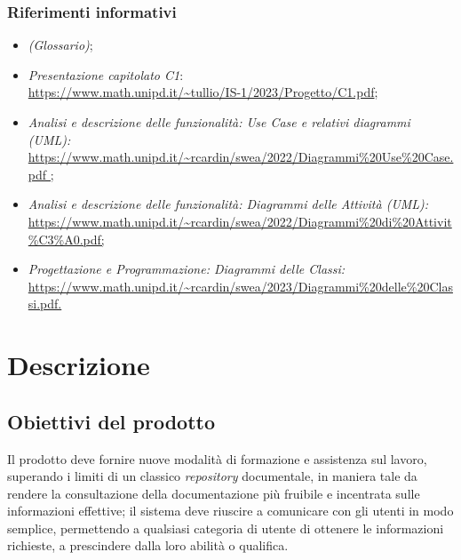 \documentclass[10pt, a4paper]{article}
\begin{document}
    \subsubsection{Riferimenti informativi}
    \begin{itemize}
    \item \textit{(Glossario)};
    \item \textit{Presentazione capitolato C1}:\\
    \href{https://www.math.unipd.it/~tullio/IS-1/2023/Progetto/C1.pdf}{https://www.math.unipd.it/\textasciitilde tullio/IS-1/2023/Progetto/C1.pdf};
    
    \item \textit{Analisi e descrizione delle funzionalità: Use Case e relativi diagrammi (UML):}\\
    \href{https://www.math.unipd.it/~rcardin/swea/2022/Diagrammi%20Use%20Case.pdf}{https://www.math.unipd.it/\textasciitilde rcardin/swea/2022/Diagrammi\%20Use\%20Case.pdf ;}
    \item \textit{Analisi e descrizione delle funzionalità: Diagrammi delle Attività (UML):}\\
    \href{https://www.math.unipd.it/~rcardin/swea/2022/Diagrammi%20di%20Attivit%C3%A0.pdf}{https://www.math.unipd.it/\textasciitilde rcardin/swea/2022/Diagrammi\%20di\%20Attivit\%C3\%A0.pdf;}
    \item \textit{Progettazione e Programmazione: Diagrammi delle Classi:}\\
    \href{https://www.math.unipd.it/~rcardin/swea/2023/Diagrammi%20delle%20Classi.pdf}{https://www.math.unipd.it/\textasciitilde rcardin/swea/2023/Diagrammi\%20delle\%20Classi.pdf.}
    \end{itemize}

\newpage
\section{Descrizione}
\subsection{Obiettivi del prodotto}
Il prodotto deve fornire nuove modalità di formazione e assistenza sul lavoro, superando i limiti di un classico \textit{repository} documentale, in maniera tale da rendere la consultazione della documentazione più fruibile e incentrata sulle informazioni effettive; il sistema deve riuscire a comunicare con gli utenti in modo semplice, permettendo a qualsiasi categoria di utente di ottenere le informazioni richieste, a prescindere dalla loro abilità o qualifica.
\end{document}
